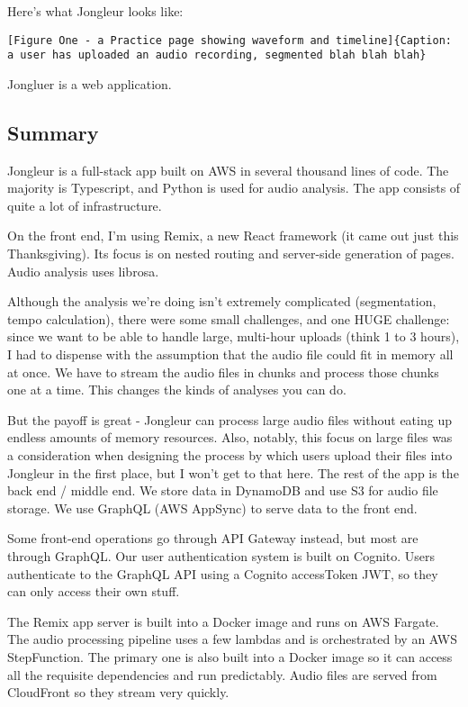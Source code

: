 \documentclass{article}
\begin{document}
Here's what Jongleur looks like:

\begin{verbatim}
[Figure One - a Practice page showing waveform and timeline]{Caption: a user has uploaded an audio recording, segmented blah blah blah}
\end{verbatim}

Jongluer is a web application.

\subsection{Summary}
Jongleur is a full-stack app built on AWS in several thousand lines of code.
The majority is Typescript, and Python is used for audio analysis.
The app consists of quite a lot of infrastructure.

On the front end, I'm using Remix, a new React framework (it came out just this Thanksgiving).
Its focus is on nested routing and server-side generation of pages.
Audio analysis uses librosa.

Although the analysis we're doing isn't extremely complicated (segmentation, tempo calculation), there were some small challenges, and one HUGE challenge: since we want to be able to handle large, multi-hour uploads (think 1 to 3 hours), I had to dispense with the assumption that the audio file could fit in memory all at once. 
We have to stream the audio files in chunks and process those chunks one at a time.
This changes the kinds of analyses you can do.

But the payoff is great - Jongleur can process large audio files without eating up endless amounts of memory resources.
Also, notably, this focus on large files was a consideration when designing the process by which users upload their files into Jongleur in the first place, but I won't get to that here.
The rest of the app is the back end / middle end. We store data in DynamoDB and use S3 for audio file storage.
We use GraphQL (AWS AppSync) to serve data to the front end.

Some front-end operations go through API Gateway instead, but most are through GraphQL.
Our user authentication system is built on Cognito.
Users authenticate to the GraphQL API using a Cognito accessToken JWT, so they can only access their own stuff.

The Remix app server is built into a Docker image and runs on AWS Fargate.
The audio processing pipeline uses a few lambdas and is orchestrated by an AWS StepFunction.
The primary one is also built into a Docker image so it can access all the requisite dependencies and run predictably.
Audio files are served from CloudFront so they stream very quickly.
\end{document}
